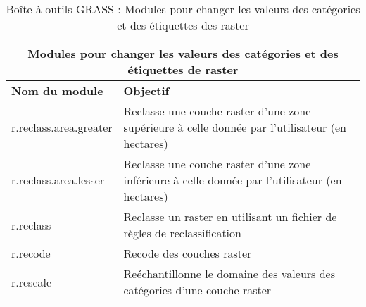 \begin{table}[ht]
\centering
 \begin{tabular}{|p{4cm}|p{10cm}|}
  \hline \multicolumn{2}{|c|}{\textbf{Modules pour changer les valeurs des catégories et des étiquettes de raster}} \\  
  \hline \textbf{Nom du module} & \textbf{Objectif} \\
  \hline r.reclass.area.greater & Reclasse une couche raster d'une zone supérieure à celle donnée par l'utilisateur (en hectares) \\
  \hline r.reclass.area.lesser & Reclasse une couche raster d'une zone inférieure à celle donnée par l'utilisateur (en hectares) \\
  \hline r.reclass & Reclasse un raster en utilisant un fichier de règles de reclassification \\
  \hline r.recode & Recode des couches raster \\
  \hline r.rescale & Reéchantillonne le domaine des valeurs des catégories d'une couche raster \\
\hline
\end{tabular}
\caption{Boîte à outils GRASS : Modules pour changer les valeurs des catégories et des étiquettes des raster}
\end{table}

